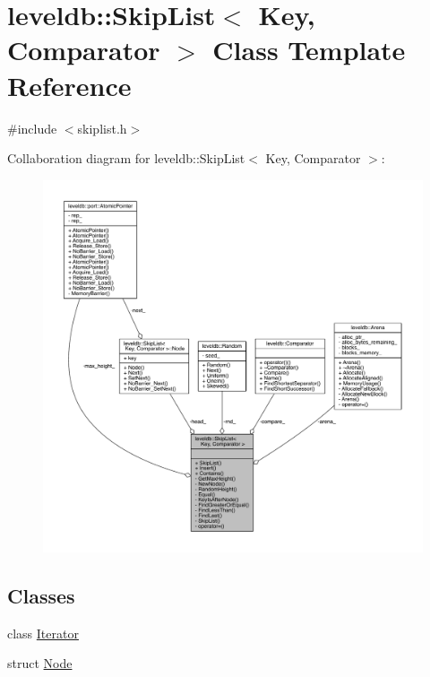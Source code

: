 \hypertarget{classleveldb_1_1_skip_list}{}\section{leveldb\+:\+:Skip\+List$<$ Key, Comparator $>$ Class Template Reference}
\label{classleveldb_1_1_skip_list}


{\ttfamily \#include $<$skiplist.\+h$>$}



Collaboration diagram for leveldb\+:\+:Skip\+List$<$ Key, Comparator $>$\+:\nopagebreak
\begin{figure}[H]
\begin{center}
\leavevmode
\includegraphics[width=350pt]{classleveldb_1_1_skip_list__coll__graph}
\end{center}
\end{figure}
\subsection*{Classes}
\begin{DoxyCompactItemize}
\item 
class \hyperlink{classleveldb_1_1_skip_list_1_1_iterator}{Iterator}
\item 
struct \hyperlink{structleveldb_1_1_skip_list_1_1_node}{Node}
\end{DoxyCompactItemize}

